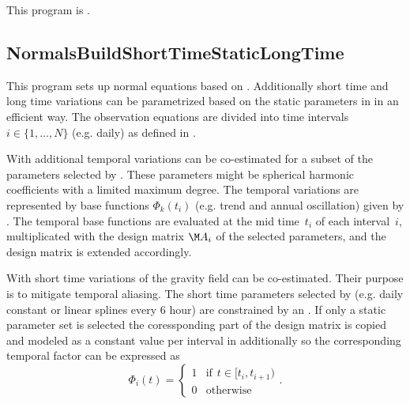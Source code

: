 This program is .
\clearpage
\subsection{NormalsBuildShortTimeStaticLongTime}\label{NormalsBuildShortTimeStaticLongTime}
This program sets up normal equations based on .
Additionally short time and long time variations can be parametrized based on the static parameters
in  in an efficient way. The observation equations
are divided into time intervals $i \in \{1, ..., N\}$ (e.g. daily) as defined in
.

With  additional temporal variations can be co-estimated
for a subset of the parameters selected by .
These parameters might be spherical harmonic coefficients with a limited maximum degree.
The temporal variations are represented by base functions $\Phi_k(t_i)$ (e.g. trend and annual oscillation)
given by .
The temporal base functions are evaluated at the mid time~$t_i$ of each interval~$i$, multiplicated
with the design matrix $\M A_i$ of the selected parameters, and the design matrix is extended
accordingly.


With  short time variations of the gravity field can be co-estimated.
Their purpose is to mitigate temporal aliasing.
The short time parameters selected by 
(e.g. daily constant or linear splines every 6 hour) are constrained by an
. If only a static parameter
set is selected the coressponding part of the design matrix is copied and modeled as a constant value
per interval in  additionally so the corresponding temporal factor can be expressed as
\begin{equation}
  \Phi_i(t)  =
  \begin{cases}
    1 &\text{if} \hspace{5pt} t \in [t_i, t_{i+1}) \\
    0 & \text{otherwise}
  \end{cases}.
\end{equation}

